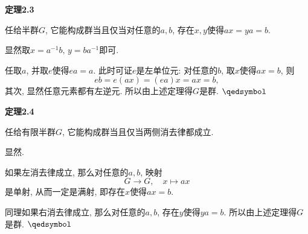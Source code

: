 \documentclass[UTF8]{ctexart}
\begin{document}
\hypertarget{sec:定理2.3}{}
\noindent\textbf{定理2.3}

任给半群$G$, 它能构成群当且仅当对任意的$a,b$, 存在$x,y$使得$ax=ya=b$.


 显然取$x=a^{-1}b,\,y=ba^{-1}$即可.


任取$a$, 并取$e$使得$ea=a$. 此时可证$e$是左单位元: 对任意的$b$, 取$x$使得$ax=b$, 则
\[
    eb=e(ax)=(ea)x=ax=b,
\]
其次, 显然任意元素都有左逆元. 所以由上述定理得$G$是群. \hfill $\qedsymbol$

\vspace{10pt}

\hypertarget{sec:定理2.4}{}
\noindent\textbf{定理2.4}

任给有限半群$G$, 它能构成群当且仅当两侧消去律都成立.


 显然.


如果左消去律成立, 那么对任意的$a,b$, 映射
\[
    G\to G,\quad x\mapsto ax
\]
是单射, 从而一定是满射, 即存在$x$使得$ax=b$.

同理如果右消去律成立, 那么对任意的$a,b$, 存在$y$使得$ya=b$.
所以由上述定理得$G$是群. \hfill $\qedsymbol$
\end{document}
